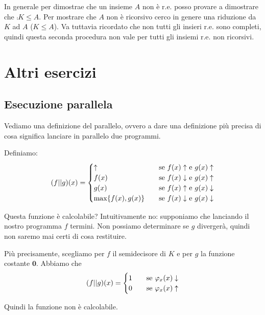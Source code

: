 In generale per dimostrae che un insieme $A$ non è r.e. posso provare a dimostrare che $\comp{K}
\leq A$. Per mostrare che $A$ non è ricorsivo cerco in genere una riduzione da $K$ ad $A$ ($K \leq
A$). Va tuttavia ricordato che non tutti gli insieri r.e. sono completi, quindi questa seconda
procedura non vale per tutti gli insiemi r.e. non ricorsivi.

\section{Altri esercizi}

\subsection{Esecuzione parallela}

Vediamo una definizione del parallelo, ovvero a dare una definizione più precisa di cosa significa
lanciare in parallelo due programmi.

Definiamo:
\begin{equation*}
    (f || g)(x) =
    \begin{cases}
        \uparrow \quad &\text{se $f(x) \uparrow$ e $g(x) \uparrow$} \\
        f(x) \quad &\text{se $f(x) \downarrow$ e $g(x) \uparrow$} \\
        g(x) \quad &\text{se $f(x) \uparrow$ e $g(x) \downarrow$} \\
        \max\{f(x),g(x)\} \quad &\text{se $f(x) \downarrow$ e $g(x) \downarrow$}
    \end{cases}
\end{equation*}

Questa funzione è calcolabile? Intuitivamente no: supponiamo che lanciando il nostro programma $f$ 
termini. Non possiamo determinare se $g$ divergerà, quindi non saremo mai certi di cosa restituire.

Più precisamente, scegliamo per $f$ il semidecisore di $K$ e per $g$ la funzione costante $\bm{0}$.
Abbiamo che
\begin{equation*}
    (f || g)(x) =
    \begin{cases}
        1 \quad &\text{se $\varphi_{x}(x)\downarrow$}\\
        0 \quad &\text{se $\varphi_{x}(x)\uparrow$}\\
    \end{cases}
\end{equation*}

Quindi la funzione non è calcolabile.

